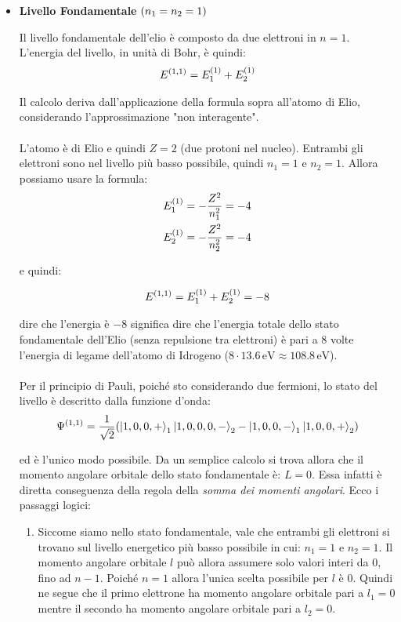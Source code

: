 \begin{itemize}
	\item \textbf{Livello Fondamentale} $\qty(n_1 = n_2 = 1)$
	
		Il livello fondamentale dell'elio è composto da due elettroni in $n = 1$. L'energia del livello, in unità di Bohr, è quindi:
	\begin{align*}
		E^{\qty(1, 1)} = E_1^{\qty(1)} + E_2^{\qty(1)}
	\end{align*}

		Il calcolo deriva dall'applicazione della formula sopra all'atomo di Elio, considerando l'approssimazione "non interagente".
	\\
	\\
		L'atomo è di Elio e quindi $Z = 2$ (due protoni nel nucleo). Entrambi gli elettroni sono nel livello più basso possibile, quindi $n_1 = 1$ e $n_2 = 1$. Allora possiamo usare la formula:
	\begin{align*}
		& E_1^{\qty(1)} = - \frac{Z^2}{n_1^2} = - 4 \\
		& E_2^{\qty(1)} = - \frac{Z^2}{n_2^2} = - 4
	\end{align*}

		e quindi:
	
	\begin{align*}
		E^{\qty(1, 1)} = E_1^{\qty(1)} +  E_2^{\qty(1)} = - 8
	\end{align*}
	
		dire che l'energia è $-8$ significa dire che l'energia totale dello stato fondamentale dell'Elio (senza repulsione tra elettroni) è pari a 8 volte l'energia di legame dell'atomo di Idrogeno ($8 \cdot 13.6 \, \text{eV} \approx 108.8 \, \text{eV}$).
		\\
		\\
		Per il principio di Pauli, poiché sto considerando due fermioni, lo stato del livello è descritto dalla funzione d'onda:
	\begin{align*}
		\Psi^{\qty(1, 1)} = \frac{1}{\sqrt{2}} \qty(\ket{1, 0, 0, +}_1 \ket{1, 0, 0, 0, -}_2 - \ket{1, 0, 0, -}_1 \ket{1, 0, 0, +}_2)
	\end{align*}
	
		ed è l'unico modo possibile. Da un semplice calcolo si trova allora che il momento angolare orbitale dello stato fondamentale è: $L = 0$. Essa infatti è diretta conseguenza della regola della \textit{somma dei momenti angolari}. Ecco i passaggi logici:
		
		\begin{enumerate}
			\item Siccome siamo nello stato fondamentale, vale che entrambi gli elettroni si trovano sul livello energetico più basso possibile in cui: $n_1 = 1$ e $n_2 = 1$. Il momento angolare orbitale $l$ può allora assumere solo valori interi da $0$, fino ad $n-1$. Poiché $n = 1$ allora l'unica scelta possibile per $l$ è $0$. Quindi ne segue che il primo elettrone ha momento angolare orbitale pari a $l_1 = 0$ mentre il secondo ha momento angolare orbitale pari a $l_2 = 0$.
		

\end{enumerate}
\end{itemize}
